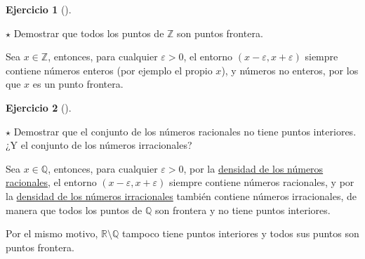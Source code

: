 \documentclass[
  spanish,
  a4paper,
]{scrreport}
\theoremstyle{definition}
\newtheorem{exercise}{Ejercicio}[chapter]
\theoremstyle{remark}
\begin{document}
\begin{exercise}[]\protect\hypertarget{exr-frontera-enteros}{}\label{exr-frontera-enteros}

\(\star\) Demostrar que todos los puntos de \(\mathbb{Z}\) son puntos
frontera.

\end{exercise}

\begin{tcolorbox}[enhanced jigsaw, arc=.35mm, bottomrule=.15mm, bottomtitle=1mm, breakable, colback=white, colbacktitle=quarto-callout-tip-color!10!white, colframe=quarto-callout-tip-color-frame, coltitle=black, left=2mm, leftrule=.75mm, opacityback=0, opacitybacktitle=0.6, rightrule=.15mm, title=\textcolor{quarto-callout-tip-color}{\faLightbulb}\hspace{0.5em}{Solución}, titlerule=0mm, toprule=.15mm, toptitle=1mm]

Sea \(x\in\mathbb{Z}\), entonces, para cualquier \(\varepsilon>0\), el
entorno \((x-\varepsilon, x+\varepsilon)\) siempre contiene números
enteros (por ejemplo el propio \(x\)), y números no enteros, por los que
\(x\) es un punto frontera.

\end{tcolorbox}

\begin{exercise}[]\protect\hypertarget{exr-interior-racionales-irracionales}{}\label{exr-interior-racionales-irracionales}

\(\star\) Demostrar que el conjunto de los números racionales no tiene
puntos interiores. ¿Y el conjunto de los números irracionales?

\end{exercise}

\begin{tcolorbox}[enhanced jigsaw, arc=.35mm, bottomrule=.15mm, bottomtitle=1mm, breakable, colback=white, colbacktitle=quarto-callout-tip-color!10!white, colframe=quarto-callout-tip-color-frame, coltitle=black, left=2mm, leftrule=.75mm, opacityback=0, opacitybacktitle=0.6, rightrule=.15mm, title=\textcolor{quarto-callout-tip-color}{\faLightbulb}\hspace{0.5em}{Solución}, titlerule=0mm, toprule=.15mm, toptitle=1mm]

Sea \(x\in\mathbb{Q}\), entonces, para cualquier \(\varepsilon>0\), por
la
\href{https://aprendeconalf.es/analisis-manual/cuerpo-reales.html\#thm-densidad-racionales}{densidad
de los números racionales}, el entorno
\((x-\varepsilon, x+\varepsilon)\) siempre contiene números racionales,
y por la
\href{https://aprendeconalf.es/analisis-manual/cuerpo-reales.html\#thm-densidad-irracionales}{densidad
de los números irracionales} también contiene números irracionales, de
manera que todos los puntos de \(\mathbb{Q}\) son frontera y no tiene
puntos interiores.

Por el mismo motivo, \(\mathbb{R}\setminus\mathbb{Q}\) tampoco tiene
puntos interiores y todos sus puntos son puntos frontera.

\end{tcolorbox}
\end{document}
